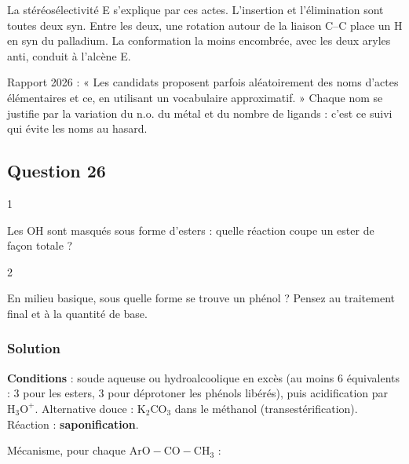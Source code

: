 \documentclass[11pt,a4paper]{article}
\begin{document}
\begin{methode}

La stéréosélectivité E s'explique par ces actes. L'insertion et l'élimination sont toutes deux syn. Entre les deux, une rotation autour de la liaison C--C place un H en syn du palladium. La conformation la moins encombrée, avec les deux aryles anti, conduit à l'alcène E.

\end{methode}

\begin{jury}

Rapport 2026 : « Les candidats proposent parfois aléatoirement des noms d'actes élémentaires et ce, en utilisant un vocabulaire approximatif. » Chaque nom se justifie par la variation du n.o. du métal et du nombre de ligands : c'est ce suivi qui évite les noms au hasard.

\end{jury}

\hypertarget{question-26}{%
\subsection{Question 26}\label{question-26}}

\begin{indication}{1}

Les OH sont masqués sous forme d'esters : quelle réaction coupe un ester de façon totale ?

\end{indication}

\begin{indication}{2}

En milieu basique, sous quelle forme se trouve un phénol ? Pensez au traitement final et à la quantité de base.

\end{indication}

\hypertarget{solution-25}{%
\subsubsection{Solution}\label{solution-25}}

\textbf{Conditions} : soude aqueuse ou hydroalcoolique en excès (au moins 6 équivalents : 3 pour les esters, 3 pour déprotoner les phénols libérés), puis acidification par \(\mathrm{H_3O^+}\). Alternative douce : \(\mathrm{K_2CO_3}\) dans le méthanol (transestérification). Réaction : \textbf{saponification}.

Mécanisme, pour chaque \(\mathrm{ArO{-}CO{-}CH_3}\) :
\end{document}
